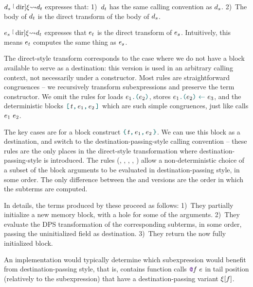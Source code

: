 $\datalangDef_s \tmcDir{\datalangRenaming} \datalangDef_t$ expresses that:
1)~$\datalangDef_t$ has the same calling convention as $\datalangDef_s$.
2)~The body of $\datalangDef_t$ is the direct transform of the body of $\datalangDef_s$.

$\datalangExpr_s \tmcDir{\datalangRenaming} \datalangDef_t$ expresses that $\datalangExpr_t$ is the direct transform of $\datalangExpr_s$.
Intuitively, this means $\datalangExpr_t$ computes the same thing as $\datalangExpr_s$.

The direct-style transform corresponds to the case where we do not have a block available to serve as a destination: this version is used in an arbitrary calling context, not necessarily under a constructor. Most rules are straightforward congruences -- we recursively transform subexpressions and preserve the term constructor. We omit the rules for loads $\datalangLoad{\datalangExpr_1}{\datalangExpr_2}$, stores $\datalangStore{\datalangExpr_1}{\datalangExpr_2}{\datalangExpr_3}$, and the deterministic blocks $\datalangBlockDet \datalangTag {\datalangExpr_1} {\datalangExpr_2}$ which are such simple congruences, just like calls $\datalangCall {\datalangExpr_1} {\datalangExpr_2}$.

The key cases are for a block construct $\datalangBlock \datalangTag {\datalangExpr_1} {\datalangExpr_2}$. We can use this block as a destination, and switch to the destination-passing-style calling convention -- these rules are the only places in the direct-style transformation where destination-passing-style is introduced. The rules (, , , , ) allow a non-deterministic choice of a subset of the block arguments to be evaluated in destination-passing style, in some order. The only difference between the  and  versions are the order in which the subterms are computed.

In details, the terms produced by these proceed as follows:
1)~They partially initialize a new memory block, with a hole for some of the arguments.
2)~They evaluate the DPS transformation of the corresponding subterms, in some order,
   passing the uninitialized field as destination.
3)~They return the now fully initialized block.

An implementation would typically determine which subexpression would benefit from destination-passing style, that is, contains function calls $\datalangCall {\datalangFnptr \datalangFn} \datalangExpr$ in tail position (relatively to the subexpression) that have a destination-passing variant $\datalangRenaming [\datalangFn]$.


